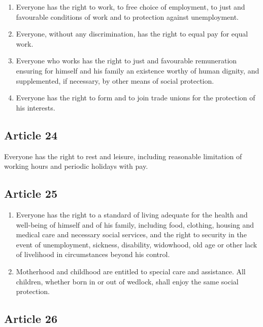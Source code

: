 \documentclass[
  ngerman,
  american,
  titlepage,
  openright,
  DIV=calc,
  toc=listof,
  listof=nochaptergap]{scrbook}
\begin{document}
\begin{enumerate}
\def\labelenumi{\arabic{enumi}.}
\item
  Everyone has the right to work, to free choice of employment, to just
  and favourable conditions of work and to protection against
  unemployment.
\item
  Everyone, without any discrimination, has the right to equal pay for
  equal work.
\item
  Everyone who works has the right to just and favourable remuneration
  ensuring for himself and his family an existence worthy of human
  dignity, and supplemented, if necessary, by other means of social
  protection.
\item
  Everyone has the right to form and to join trade unions for the
  protection of his interests.
\end{enumerate}

\subsection{Article 24}\label{article-24-2}

Everyone has the right to rest and leisure, including reasonable
limitation of working hours and periodic holidays with pay.

\subsection{Article 25}\label{article-25-2}

\begin{enumerate}
\def\labelenumi{\arabic{enumi}.}
\item
  Everyone has the right to a standard of living adequate for the health
  and well-being of himself and of his family, including food, clothing,
  housing and medical care and necessary social services, and the right
  to security in the event of unemployment, sickness, disability,
  widowhood, old age or other lack of livelihood in circumstances beyond
  his control.
\item
  Motherhood and childhood are entitled to special care and assistance.
  All children, whether born in or out of wedlock, shall enjoy the same
  social protection.
\end{enumerate}

\subsection{Article 26}\label{article-26-2}
\end{document}
